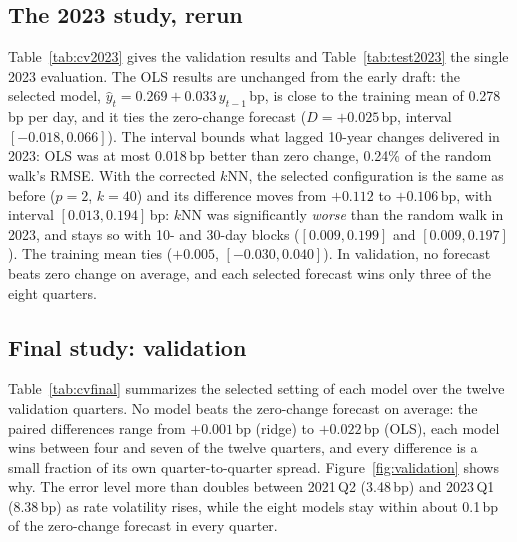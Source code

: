 \documentclass{article}
\newcommand{\gentable}[2][\small]{{#1\setlength{\tabcolsep}{4pt}}}
\begin{document}
\subsection{The 2023 study, rerun}
Table~\ref{tab:cv2023} gives the validation results and Table~\ref{tab:test2023} the single 2023 evaluation. The OLS results are unchanged from the early draft: the selected model, $\widehat y_t = 0.269 + 0.033\,y_{t-1}$\,bp, is close to the training mean of 0.278\,bp per day, and it ties the zero-change forecast ($D = +0.025$\,bp, interval $[-0.018, 0.066]$). The interval bounds what lagged 10-year changes delivered in 2023: OLS was at most 0.018\,bp better than zero change, 0.24\% of the random walk's RMSE. With the corrected $k$NN, the selected configuration is the same as before ($p=2$, $k=40$) and its difference moves from $+0.112$ to $+0.106$\,bp, with interval $[0.013, 0.194]$\,bp: $k$NN was significantly \emph{worse} than the random walk in 2023, and stays so with 10- and 30-day blocks ($[0.009, 0.199]$ and $[0.009, 0.197]$). The training mean ties ($+0.005$, $[-0.030, 0.040]$). In validation, no forecast beats zero change on average, and each selected forecast wins only three of the eight quarters.

\begin{table}[t]
  \caption{2023 study: validation RMSE over the eight quarters of 2021--2022 (mean $\pm$ sample s.d.\ across quarters), and the paired per-quarter difference $D$ from zero change (mean $\pm$ s.d.; negative favors the model) with the number of quarters in which the model beats zero change. The lowest mean RMSE selects each model's setting.}
  \label{tab:cv2023}
  \centering
  \gentable{tab_cv2023}
\end{table}

\begin{table}[t]
  \caption{2023 study: held-out 2023 forecasts ($n=250$ days). $D$ is the model's RMSE minus the zero-change RMSE. Intervals: paired circular block bootstrap, 20-day blocks, 10,000 resamples. Only $k$NN's interval excludes zero, and it lies above zero: $k$NN is worse than the random walk.}
  \label{tab:test2023}
  \centering
  \gentable{tab_test2023}
\end{table}

\subsection{Final study: validation}
Table~\ref{tab:cvfinal} summarizes the selected setting of each model over the twelve validation quarters. No model beats the zero-change forecast on average: the paired differences range from $+0.001$\,bp (ridge) to $+0.022$\,bp (OLS), each model wins between four and seven of the twelve quarters, and every difference is a small fraction of its own quarter-to-quarter spread. Figure~\ref{fig:validation} shows why. The error level more than doubles between 2021\,Q2 (3.48\,bp) and 2023\,Q1 (8.38\,bp) as rate volatility rises, while the eight models stay within about 0.1\,bp of the zero-change forecast in every quarter.
\end{document}
